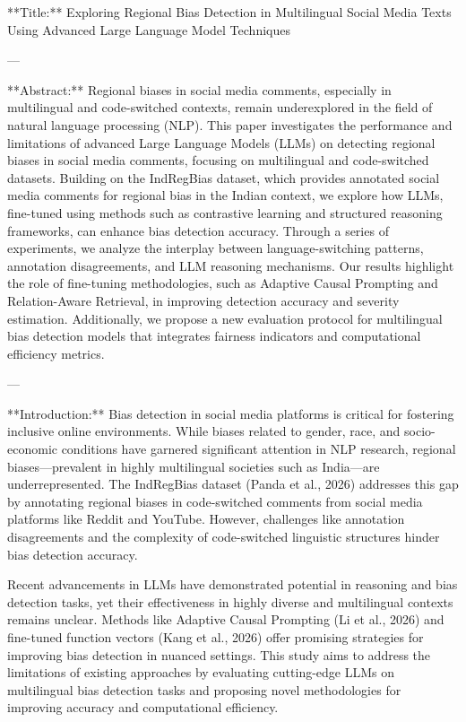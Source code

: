 **Title:** Exploring Regional Bias Detection in Multilingual Social Media Texts Using Advanced Large Language Model Techniques  

---

**Abstract:**  
Regional biases in social media comments, especially in multilingual and code-switched contexts, remain underexplored in the field of natural language processing (NLP). This paper investigates the performance and limitations of advanced Large Language Models (LLMs) on detecting regional biases in social media comments, focusing on multilingual and code-switched datasets. Building on the IndRegBias dataset, which provides annotated social media comments for regional bias in the Indian context, we explore how LLMs, fine-tuned using methods such as contrastive learning and structured reasoning frameworks, can enhance bias detection accuracy. Through a series of experiments, we analyze the interplay between language-switching patterns, annotation disagreements, and LLM reasoning mechanisms. Our results highlight the role of fine-tuning methodologies, such as Adaptive Causal Prompting and Relation-Aware Retrieval, in improving detection accuracy and severity estimation. Additionally, we propose a new evaluation protocol for multilingual bias detection models that integrates fairness indicators and computational efficiency metrics.  

---

**Introduction:**  
Bias detection in social media platforms is critical for fostering inclusive online environments. While biases related to gender, race, and socio-economic conditions have garnered significant attention in NLP research, regional biases—prevalent in highly multilingual societies such as India—are underrepresented. The IndRegBias dataset (Panda et al., 2026) addresses this gap by annotating regional biases in code-switched comments from social media platforms like Reddit and YouTube. However, challenges like annotation disagreements and the complexity of code-switched linguistic structures hinder bias detection accuracy.  

Recent advancements in LLMs have demonstrated potential in reasoning and bias detection tasks, yet their effectiveness in highly diverse and multilingual contexts remains unclear. Methods like Adaptive Causal Prompting (Li et al., 2026) and fine-tuned function vectors (Kang et al., 2026) offer promising strategies for improving bias detection in nuanced settings. This study aims to address the limitations of existing approaches by evaluating cutting-edge LLMs on multilingual bias detection tasks and proposing novel methodologies for improving accuracy and computational efficiency.  

